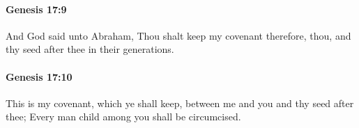 		\paragraph{Genesis 17:9} %
			\label{GENESIS-17-9}

			And God said unto Abraham, Thou shalt keep my covenant therefore, thou, and thy seed after thee in their generations.


		\paragraph{Genesis 17:10} %
			\label{GENESIS-17-10}

			This is my covenant, which ye shall keep, between me and you and thy seed after thee; Every man child among you shall be circumcised.


